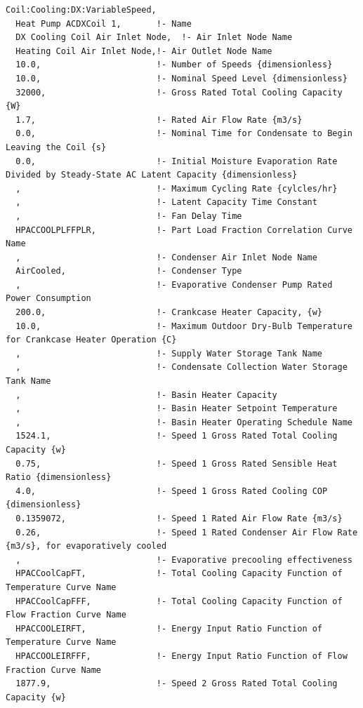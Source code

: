 \begin{lstlisting}
Coil:Cooling:DX:VariableSpeed,
  Heat Pump ACDXCoil 1,       !- Name
  DX Cooling Coil Air Inlet Node,  !- Air Inlet Node Name
  Heating Coil Air Inlet Node,!- Air Outlet Node Name
  10.0,                       !- Number of Speeds {dimensionless}
  10.0,                       !- Nominal Speed Level {dimensionless}
  32000,                      !- Gross Rated Total Cooling Capacity {W}
  1.7,                        !- Rated Air Flow Rate {m3/s}
  0.0,                        !- Nominal Time for Condensate to Begin Leaving the Coil {s}
  0.0,                        !- Initial Moisture Evaporation Rate Divided by Steady-State AC Latent Capacity {dimensionless}
  ,                           !- Maximum Cycling Rate {cylcles/hr}
  ,                           !- Latent Capacity Time Constant
  ,                           !- Fan Delay Time
  HPACCOOLPLFFPLR,            !- Part Load Fraction Correlation Curve Name
  ,                           !- Condenser Air Inlet Node Name
  AirCooled,                  !- Condenser Type
  ,                           !- Evaporative Condenser Pump Rated Power Consumption
  200.0,                      !- Crankcase Heater Capacity, {w}
  10.0,                       !- Maximum Outdoor Dry-Bulb Temperature for Crankcase Heater Operation {C}
  ,                           !- Supply Water Storage Tank Name
  ,                           !- Condensate Collection Water Storage Tank Name
  ,                           !- Basin Heater Capacity
  ,                           !- Basin Heater Setpoint Temperature
  ,                           !- Basin Heater Operating Schedule Name
  1524.1,                     !- Speed 1 Gross Rated Total Cooling Capacity {w}
  0.75,                       !- Speed 1 Gross Rated Sensible Heat Ratio {dimensionless}
  4.0,                        !- Speed 1 Gross Rated Cooling COP {dimensionless}
  0.1359072,                  !- Speed 1 Rated Air Flow Rate {m3/s}
  0.26,                       !- Speed 1 Rated Condenser Air Flow Rate {m3/s}, for evaporatively cooled
  ,                           !- Evaporative precooling effectiveness
  HPACCoolCapFT,              !- Total Cooling Capacity Function of Temperature Curve Name
  HPACCoolCapFFF,             !- Total Cooling Capacity Function of Flow Fraction Curve Name
  HPACCOOLEIRFT,              !- Energy Input Ratio Function of Temperature Curve Name
  HPACCOOLEIRFFF,             !- Energy Input Ratio Function of Flow Fraction Curve Name
  1877.9,                     !- Speed 2 Gross Rated Total Cooling Capacity {w}

\end{lstlisting}
